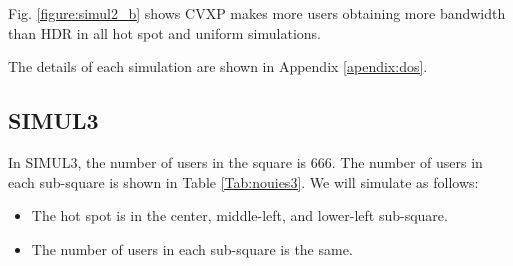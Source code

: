 	Fig. \ref{figure:simul2_b} shows CVXP makes more users obtaining more bandwidth than HDR in all hot spot and uniform simulations.
	
	The details of each simulation are shown in Appendix \ref{apendix:dos}.

\subsection{SIMUL3}
	In SIMUL3, the number of users in the square is $666$. The number of users in each sub-square is shown in Table \ref{Tab:nouies3}. We will simulate as follows: 
	\begin{itemize}
		\item The hot spot is in the center, middle-left, and lower-left sub-square.
		\item The number of users in each sub-square is the same.
	\end{itemize}
	

